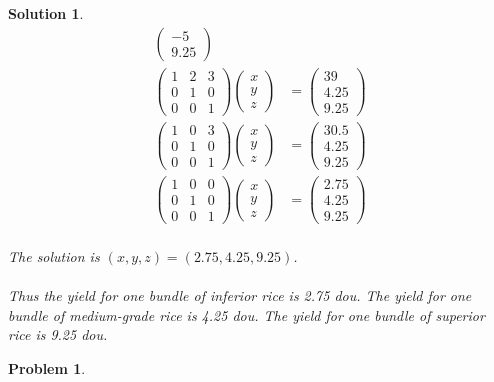 \documentclass{article}
\newtheorem{problem}{Problem}
\newtheorem*{solution}{Solution}
\begin{document}
\begin{solution}
\begin{align*}
\begin{pmatrix}
-5 \\
9.25
\end{pmatrix}
\\
\begin{pmatrix}
1 & 2 & 3 \\
0 & 1 & 0 \\
0 & 0 & 1
\end{pmatrix}
\begin{pmatrix}
x \\ 
y \\
z
\end{pmatrix}
&=
\begin{pmatrix}
39 \\
4.25 \\
9.25
\end{pmatrix}
\\
\begin{pmatrix}
1 & 0 & 3 \\
0 & 1 & 0 \\
0 & 0 & 1
\end{pmatrix}
\begin{pmatrix}
x \\ 
y \\
z
\end{pmatrix}
&=
\begin{pmatrix}
30.5 \\
4.25 \\
9.25
\end{pmatrix}
\\
\begin{pmatrix}
1 & 0 & 0 \\
0 & 1 & 0 \\
0 & 0 & 1
\end{pmatrix}
\begin{pmatrix}
x \\ 
y \\
z
\end{pmatrix}
&=
\begin{pmatrix}
2.75 \\
4.25 \\
9.25
\end{pmatrix}
\end{align*} 
\\
The solution is $(x, y, z) = (2.75, 4.25, 9.25)$. \\ \\
Thus the yield for one bundle of inferior rice is 2.75 dou. The yield for one bundle of medium-grade rice is 4.25 dou. The yield for one bundle of superior rice is 9.25 dou.

\end{solution}

\begin{problem}
\end{problem}
\end{document}
